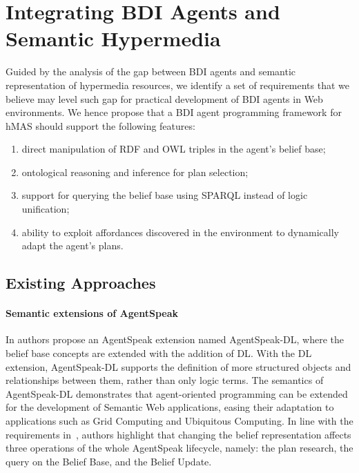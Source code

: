 \documentclass[
]{ceurart}
\begin{document}
\section{Integrating \acs{BDI} Agents and Semantic Hypermedia}
\label{sec:integrating-bdi-hypermedia}


Guided by the analysis of the gap between \ac{BDI} agents and semantic representation of hypermedia resources,
we identify a set of requirements that we believe may level such gap for practical development of \ac{BDI} agents in Web environments.
We hence propose that a \ac{BDI} agent programming framework for \ac{hMAS} should support the following features:
\begin{enumerate}[label={(R\arabic*)}]
  \item direct manipulation of \ac{RDF} and \ac{OWL} triples in the agent's belief base;
  \label{req:first}
  \item ontological reasoning and inference for plan selection;
  \label{req:second}
  \item support for querying the belief base using \ac{SPARQL} instead of logic unification;
  \label{req:third}
  \item ability to exploit affordances discovered in the environment to dynamically adapt the agent's plans.
  \label{req:fourth}
\end{enumerate}

\subsection{Existing Approaches}
\label{subsec:existing-approaches}

\paragraph{Semantic extensions of AgentSpeak}
In \cite{DBLP:conf/dalt/MoreiraVBH05} authors propose an AgentSpeak extension named AgentSpeak-DL, 
where the belief base concepts are extended with the addition of \ac{DL}.
%
With the \ac{DL} extension, 
AgentSpeak-DL supports the definition of more structured objects and relationships between them, 
rather than only logic terms.
%
The semantics of AgentSpeak-DL demonstrates that agent-oriented programming can be extended for the development of Semantic Web applications, 
easing their adaptation to applications such as Grid Computing and Ubiquitous Computing.
%
In line with the requirements in~, 
authors highlight that changing the belief representation affects three operations of the whole AgentSpeak lifecycle, namely: the plan research, the query on the Belief Base, and the Belief Update.
\end{document}
